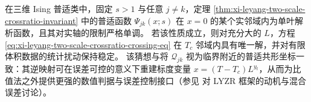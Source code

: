 \begin{conjecture}[交比标度函数的局部单叶性与唯一交汇]\label{conj:xi-leyang-two-scale-crossratio-univalence}
在三维 Ising 普适类中，固定 \(s>1\) 与任意 \(j\neq k\)，定理 \ref{thm:xi-leyang-two-scale-crossratio-invariant} 中的普适函数 \(\Psi_{jk}(x;s)\) 在 \(x=0\) 的某个实邻域内为单叶解析函数，且其对实轴的限制严格单调。
若该性质成立，则对充分大的 \(L\)，方程 \eqref{eq:xi-leyang-two-scale-crossratio-crossing-eq} 在 \(T_c\) 邻域内具有唯一解，并对有限体积数据的统计扰动保持稳定。
该猜想与将 \(\mathcal Q_{jk}\) 视为临界附近的普适共形坐标一致：其逆映射可在误差可控的意义下重建标度变量 \(x=(T-T_c)L^{y_t}\)，从而为比值法之外提供更强的数值判据与误差控制接口（参见 \cite{WadaKitazawaKanaya2025LYZR} 对 LYZR 框架的动机与混合误差讨论）。
\end{conjecture}

